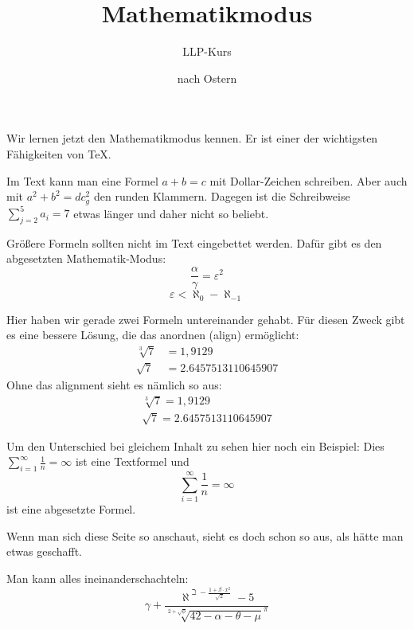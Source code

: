 \documentclass{scrartcl}
\title{Mathematikmodus}
\author{LLP-Kurs}
\date{nach Ostern}
\begin{document}
\maketitle
  Wir lernen jetzt den Mathematikmodus kennen. Er ist einer der wichtigsten Fähigkeiten von \TeX.

  Im Text kann man eine Formel $a + b = c$ mit Dollar-Zeichen schreiben. Aber auch mit \(a^2 + b^2 = dc_g^2\) den runden Klammern. Dagegen ist die Schreibweise
  \begin{math}
    \sum^5_{j=2} a_i = 7
  \end{math}
  etwas länger und daher nicht so beliebt.

  Größere Formeln sollten nicht im Text eingebettet werden. Dafür gibt es den abgesetzten Mathematik-Modus:
  \begin{equation}
    \frac{\alpha}{\gamma} = \varepsilon^2
  \end{equation}
  \begin{equation}
    \varepsilon < \aleph_0 - \aleph_{-1}
  \end{equation}

  Hier haben wir gerade zwei Formeln untereinander gehabt. Für diesen Zweck gibt es eine bessere Lösung, die das anordnen (align) ermöglicht:
  \begin{align}
    \sqrt[3]{7} &= 1,9129 \\
    \sqrt{7} &= 2.6457513110645907
  \end{align}
  Ohne das alignment sieht es nämlich so aus:
  \begin{align}
    \sqrt[3]{7} = 1,9129 \\
    \sqrt{7} = 2.6457513110645907
  \end{align}

  Um den Unterschied bei gleichem Inhalt zu sehen hier noch ein Beispiel:
  Dies $\sum_{i=1}^\infty\frac{1}{n}=\infty$ ist eine Textformel und
  \begin{equation}
    \sum_{i=1}^\infty\frac{1}{n} = \infty
  \end{equation}
  ist eine abgesetzte Formel.

  Wenn man sich diese Seite so anschaut, sieht es doch schon so aus, als hätte man etwas geschafft.

  Man kann alles ineinanderschachteln:
  \begin{equation}
    \gamma +
    \frac{
      \aleph^{
        \beth -
        \frac{
          1+\beta\cdot x^2
        }{
          \sqrt{2}
        }
      }-5
    }{
      \sqrt[2+\sqrt{\phi}]{
        42-\alpha-\theta-\mu
      }^\pi
    }
  \end{equation}
\end{document}
